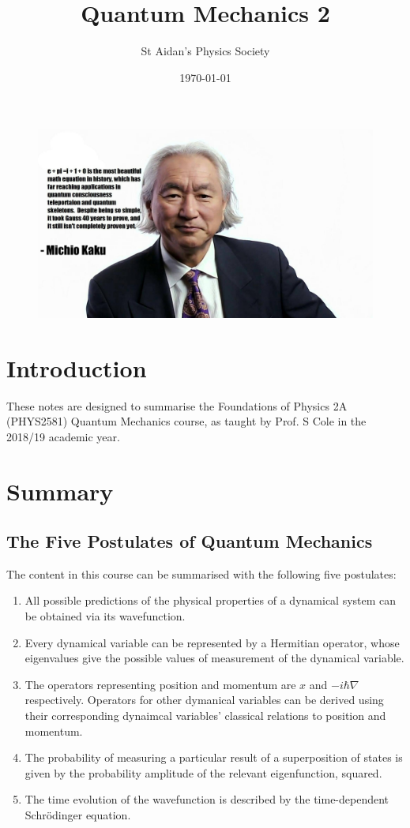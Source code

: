 \documentclass{physics_notes}
\title{Quantum Mechanics 2}
\author{St Aidan's Physics Society}
\date{\today}
\begin{document}
\maketitle
\begin{figure}[h!]
	\centering
	\includegraphics[width=\linewidth]{Figures/mich.png}
\end{figure}
\tableofcontents
\newpage

\section*{Introduction}

These notes are designed to summarise the Foundations of Physics 2A (PHYS2581) Quantum Mechanics course, as taught by Prof. S Cole in the 2018/19 academic year. 

\section*{Summary}

\subsection*{The Five Postulates of Quantum Mechanics}

The content in this course can be summarised with the following five postulates:

\begin{enumerate}
	\item All possible predictions of the physical properties of a dynamical system can be obtained via its wavefunction.
	\item Every dynamical variable can be represented by a Hermitian operator, whose eigenvalues give the possible values of measurement of the dynamical variable. 
	\item The operators representing position and momentum are $x$ and $-i\hbar\nabla$ respectively. Operators for other dymanical variables can be derived using their corresponding dynaimcal variables' classical relations to position and momentum. 
	\item The probability of measuring a particular result of a superposition of states is given by the probability amplitude of the relevant eigenfunction, squared. 
	\item The time evolution of the wavefunction is described by the time-dependent Schr\"odinger equation.
\end{enumerate}
\end{document}
